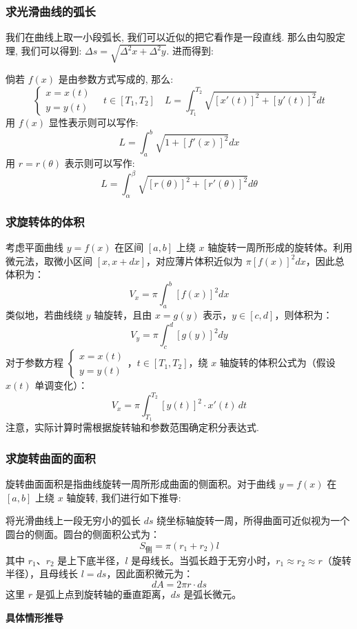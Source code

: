 \documentclass[a4paper,12pt]{ctexart}
\begin{document}
\subsubsection{求光滑曲线的弧长}
我们在曲线上取一小段弧长, 我们可以近似的把它看作是一段直线. 那么由勾股定理, 我们可以得到: $\Delta s = \sqrt{\Delta^2 x+\Delta^2y}$. 进而得到:

倘若 $f(x)$ 是由参数方式写成的, 那么:
$$
\begin{cases}
    x = x(t) \\
    y = y(t)
\end{cases}
\quad t \in [T_1,T_2]
\quad L=\int_{T_1}^{T_2}\sqrt{[x'(t)]^2+[y'(t)]^2} dt
$$
用 $f(x)$ 显性表示则可以写作:
$$
L = \int_a^b\sqrt{1+[f'(x)]^2}dx
$$
用 $r = r(\theta)$ 表示则可以写作:
$$
L = \int_{\alpha}^{\beta} \sqrt{[r(\theta)]^2+[r'(\theta)]^2}d\theta
$$

\subsubsection{求旋转体的体积}
考虑平面曲线 $y = f(x)$ 在区间 $[a, b]$ 上绕 $x$ 轴旋转一周所形成的旋转体。利用微元法，取微小区间 $[x, x+dx]$，对应薄片体积近似为 $\pi [f(x)]^2 dx$，因此总体积为：
$$
V_x = \pi \int_a^b [f(x)]^2 dx
$$
类似地，若曲线绕 $y$ 轴旋转，且由 $x = g(y)$ 表示，$y \in [c, d]$，则体积为：
$$
V_y = \pi \int_c^d [g(y)]^2 dy
$$
对于参数方程 $\begin{cases} x = x(t) \\ y = y(t) \end{cases}$，$t \in [T_1, T_2]$，绕 $x$ 轴旋转的体积公式为（假设 $x(t)$ 单调变化）：
$$
V_x = \pi \int_{T_1}^{T_2} [y(t)]^2 \cdot x'(t) \, dt
$$
注意，实际计算时需根据旋转轴和参数范围确定积分表达式.

\subsubsection{求旋转曲面的面积}
旋转曲面面积是指曲线旋转一周所形成曲面的侧面积。对于曲线 $y = f(x)$ 在 $[a, b]$ 上绕 $x$ 轴旋转, 我们进行如下推导:

将光滑曲线上一段无穷小的弧长 $ds$ 绕坐标轴旋转一周，所得曲面可近似视为一个圆台的侧面。圆台的侧面积公式为：
$$ S_{\text{侧}} = \pi (r_1 + r_2) l $$
其中 $r_1$、$r_2$ 是上下底半径，$l$ 是母线长。当弧长趋于无穷小时，$r_1 \approx r_2 \approx r$（旋转半径），且母线长 $l = ds$，因此面积微元为：
$$ dA = 2\pi r \cdot ds $$
这里 $r$ 是弧上点到旋转轴的垂直距离，$ds$ 是弧长微元。

\textbf{具体情形推导}
\end{document}

